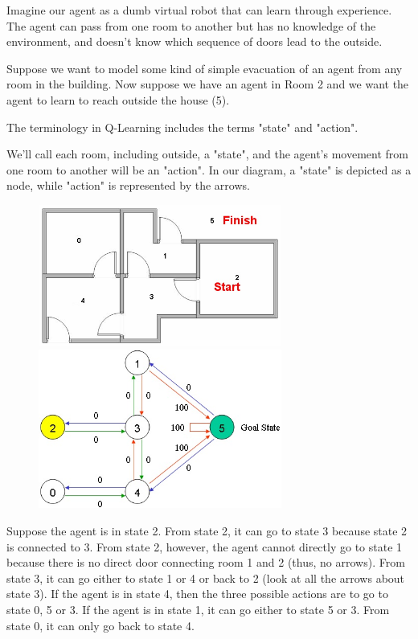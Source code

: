 \documentclass[a4paper, 11pt]{article}
\begin{document}
Imagine our agent as a dumb virtual robot that can learn through experience. The agent can pass from one room to another but has no knowledge of the environment, and doesn't know which sequence of doors lead to the outside.

Suppose we want to model some kind of simple evacuation of an agent from any room in the building. Now suppose we have an agent in Room 2 and we want the agent to learn to reach outside the house (5).

The terminology in Q-Learning includes the terms "state" and "action".

We'll call each room, including outside, a "state", and the agent's movement from one room to another will be an "action".  In our diagram, a "state" is depicted as a node, while "action" is represented by the arrows.

\begin{figure}[H]
\centering
\includegraphics[width=8cm]{fig/agent_clip_image002}
\quad
\includegraphics[width=8cm]{fig/map3a}
\end{figure}

Suppose the agent is in state 2.  From state 2, it can go to state 3 because state 2 is connected to 3.  From state 2, however, the agent cannot directly go to state 1 because there is no direct door connecting room 1 and 2 (thus, no arrows).  From state 3, it can go either to state 1 or 4 or back to 2 (look at all the arrows about state 3).  If the agent is in state 4, then the three possible actions are to go to state 0, 5 or 3.  If the agent is in state 1, it can go either to state 5 or 3.  From state 0, it can only go back to state 4.
\end{document}
